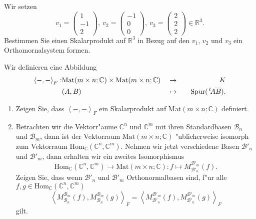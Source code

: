 \documentclass[a4,11pt]{article}
\begin{document}
\vspace*{-17mm}
{
\kopf
}


\begin{aufgabe}[4 Punkte]
Wir setzen 
\[
v_1 = \begin{pmatrix}1\\-1\\2\end{pmatrix}, \ v_2 = \begin{pmatrix}-1\\0\\0\end{pmatrix}, \ v_3 = \begin{pmatrix}2\\2\\2\end{pmatrix} \in \mathbb{R}^3.
\]
Bestimmen Sie einen Skalarprodukt auf $\mathbb{R}^3$ in Bezug auf den $v_1$, $v_2$ und $v_3$ ein Orthomornalsystem formen.
\end{aufgabe}

\begin{aufgabe}[4 Punkte]
Wir definieren eine Abbildung 
\begin{align*}
\left<-,-\right>_{F} : &\text{Mat}(m \times n; \mathbb{C}) \times\text{Mat}(m \times n; \mathbb{C}) &&\to &&&K\\
&(A,B)&&\mapsto &&&\text{Spur}(\,^t\!A \overline{B}).
\end{align*}
\begin{enumerate}
\item Zeigen Sie, dass $\left<-,-\right>_{F}$ ein Skalarprodukt auf $\text{Mat}(m \times n; \mathbb{C})$ definiert.
\item Betrachten wir die Vektorr"aume $\mathbb{C}^n$ und $\mathbb{C}^m$ mit ihren Standardbasen $\mathcal{B}_n$ und $\mathcal{B}_m$, dann ist der Vektorraum $\text{Mat}(m \times n; \mathbb{C})$ "ublicherweise isomorph zum Vektorraum $\text{Hom}_\mathbb{C}(\mathbb{C}^n, \mathbb{C}^m)$. Nehmen wir jetzt verschiedene Basen $\mathcal{B}'_n$ und $\mathcal{B}'_m$, dann erhalten wir ein zweites Isomorphismus
\[
\text{Hom}_\mathbb{C}(\mathbb{C}^n, \mathbb{C}^m) \to \text{Mat}(m \times n; \mathbb{C}) : f \mapsto M_{\mathcal{B}'_n}^{\mathcal{B}'_m}(f).
\]
Zeigen Sie, dass wenn $\mathcal{B}'_n$ und $\mathcal{B}'_m$ Orthonormalbasen sind, f"ur alle $f, g \in \text{Hom}_\mathbb{C}(\mathbb{C}^n, \mathbb{C}^m)$
\[
\left<M_{\mathcal{B}_n}^{\mathcal{B}_m}(f),M_{\mathcal{B}_n}^{\mathcal{B}_m}(g)\right>_{F} = \left<M_{\mathcal{B}'_n}^{\mathcal{B}'_m}(f),M_{\mathcal{B}'_n}^{\mathcal{B}'_m}(g)\right>_{F}
\]
gilt.
\begin{center}

\end{center}
\end{enumerate}
\end{aufgabe}
\end{document}
